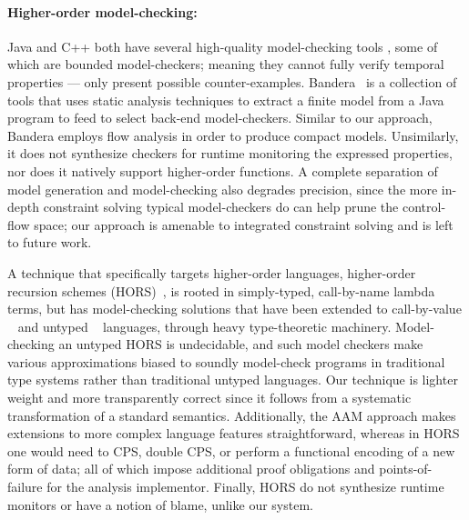 \paragraph{Higher-order model-checking:}
Java and C++ both have several high-quality model-checking tools \citep{ianjohnson:bandera, ianjohnson:java-pathfinder, ianjohnson:LLBMC}, some of which are bounded model-checkers; meaning they cannot fully verify temporal properties --- only present possible counter-examples.
%
Bandera~\citep{ianjohnson:bandera} is a collection of tools that uses static analysis techniques to extract a finite model from a Java program to feed to select back-end model-checkers.
%
Similar to our approach, Bandera employs flow analysis in order to produce compact models.
%
Unsimilarly, it does not synthesize checkers for runtime monitoring the expressed properties, nor does it natively support higher-order functions.
%
A complete separation of model generation and model-checking also degrades precision, since the more in-depth constraint solving typical model-checkers do can help prune the control-flow space; our approach is amenable to integrated constraint solving and is left to future work.

A technique that specifically targets higher-order languages, higher-order recursion schemes (HORS)~\citep{ianjohnson:Knapik:2002:HPT:646794.704852}, is rooted in simply-typed, call-by-name lambda terms, but has model-checking solutions that have been extended to call-by-value ~\citep{ianjohnson:DBLP:journals/jacm/Kobayashi13} and untyped ~\citep{dvanhorn:Tsukada2010Untyped} languages, through heavy type-theoretic machinery.
%
Model-checking an untyped HORS is undecidable, and such model checkers make various approximations biased to soundly model-check programs in traditional type systems rather than traditional untyped languages.
%
Our technique is lighter weight and more transparently correct since it follows from a systematic transformation of a standard semantics.
%
Additionally, the AAM approach makes extensions to more complex language features straightforward, whereas in HORS one would need to CPS, double CPS, or perform a functional encoding of a new form of data; all of which impose additional proof obligations and points-of-failure for the analysis implementor.
%
Finally, HORS do not synthesize runtime monitors or have a notion of blame, unlike our system.

